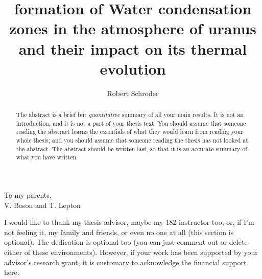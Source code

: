 \documentclass[11pt]{ucscthesisbs}
\begin{document}

\title{formation of Water condensation zones in the atmosphere of uranus and their impact on its thermal evolution}
\author{Robert Schroder}
%
%



\maketitle
\copyrightpage

\begin{frontmatter}

\begin{abstract}
The abstract is a brief but {\it quantitative} summary of all your main results.  It is not an introduction, and it is not a part of your thesis text.  You should assume that someone reading the abstract learns the essentials of what they would learn from reading your whole thesis; and you should assume that someone reading the thesis has not looked at the abstract.  The abstract should be written last, so that it is an accurate summary of what you have written.
\end{abstract}

\tableofcontents
%
%
\listoffigures
\listoftables

\begin{dedication}
\null\vfil
{\large
\begin{center}
To my parents,\\\vspace{12pt}
V. Boson and T. Lepton
\end{center}}
\vfil\null
\end{dedication}

\begin{acknowledgements}
I would like to thank my thesis advisor, maybe my 182 instructor too, or, if I'm not feeling it, my family and friends, or even no one at all (this section is optional).  The dedication is optional too (you can just comment out or delete either of these environments).  However, if your work has been supported by your advisor's research grant, it is customary to acknowledge the financial support here.
\end{acknowledgements}


\end{frontmatter}
\end{document}
